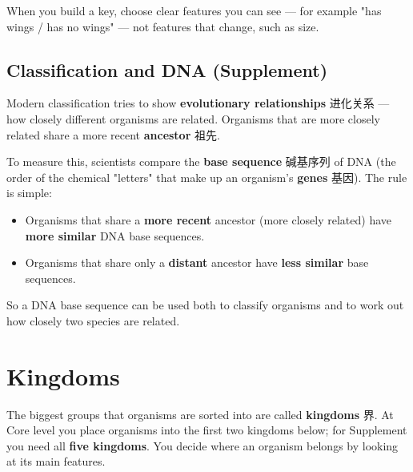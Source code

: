 \documentclass[11pt]{article}
\begin{document}
When you build a key, choose clear features you can see — for example "has wings / has no wings" — not features that change, such as size.

\subsection*{Classification and DNA (Supplement)}

Modern classification tries to show \textbf{evolutionary relationships} 进化关系 — how closely different organisms are related. Organisms that are more closely related share a more recent \textbf{ancestor} 祖先.

To measure this, scientists compare the \textbf{base sequence} 碱基序列 of DNA (the order of the chemical "letters" that make up an organism's \textbf{genes} 基因). The rule is simple:

\begin{itemize}
\item Organisms that share a \textbf{more recent} ancestor (more closely related) have \textbf{more similar} DNA base sequences.

\item Organisms that share only a \textbf{distant} ancestor have \textbf{less similar} base sequences.

\end{itemize}

So a DNA base sequence can be used both to classify organisms and to work out how closely two species are related.

\section*{Kingdoms}

The biggest groups that organisms are sorted into are called \textbf{kingdoms} 界. At Core level you place organisms into the first two kingdoms below; for Supplement you need all \textbf{five kingdoms}. You decide where an organism belongs by looking at its main features.
\end{document}
